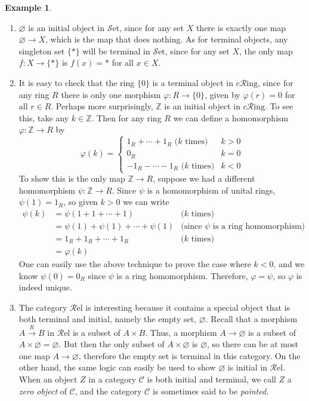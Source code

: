 \documentclass[10pt,oneside]{book}
\def\~#1{\mathscr{#1}}
\def\To#1{\xrightarrow{#1}}
\newcommand{\Z}{\mathbb{Z}}
\newcommand{\Set}{\~S\mathrm{et}}
\newcommand{\Rel}{\~R\mathrm{el}}
\newcommand{\cRing}{\mathrm{c}\~{R}\mathrm{ing}}
\newcommand{\vp}{\varphi}
\theoremstyle{plain}
\theoremstyle{definition}
\newtheorem{ex}[thm]{Example}
\theoremstyle{remark}
\numberwithin{equation}{section}
\numberwithin{figure}{section}
\begin{document}
\begin{ex}
\hfill
\begin{enumerate}[label=(\roman*)]

    \item $\varnothing$ is an initial object in $\Set$, since for any set $X$ there is exactly one map $\varnothing \to X$, which is the map that does nothing. As for terminal objects, any singleton set $\{\ast\}$ will be terminal in $\Set$, since for any set $X$, the only map $f: X \to \{\ast\}$ is $f(x) = \ast$ for all $x \in X$.
    
    \item It is easy to check that the ring $\{0\}$ is a terminal object in $\cRing$, since for any ring $R$ there is only one morphism $\vp: R \to \{0\}$, given by $\vp(r) = 0$ for all $r \in R$. Perhaps more surprisingly, $\Z$ is an initial object in $\cRing$. To see this, take any $k \in \Z$. Then for any ring $R$ we can define a homomorphism $\vp: \Z \to R$ by
        \[ \vp(k) = \begin{cases} 
          1_R + \cdots + 1_R \text{ ($k$ times)} & k > 0 \\
          0_R & k = 0 \\
          -1_R - \cdots - 1_R \text{ ($k$ times)} & k < 0
       \end{cases}\]
   To show this is the only map $\Z \to R$, suppose we had a different homomorphism $\psi: \Z \to R$. Since $\psi$ is a homomorphism of unital rings, $\psi(1)  = 1_R$, so given $k > 0$ we can write 
   \begin{align*}
       \psi(k) &= \psi(1 + 1 + \cdots + 1) & \text{($k$ times)} \\
               &= \psi(1) + \psi(1) + \cdots + \psi(1) & \text{(since $\psi$ is a ring homomorphism)} \\
               &= 1_R + 1_R + \cdots + 1_R & \text{($k$ times)} \\
               &= \vp(k)
   \end{align*}
   One can easily use the above technique to prove the case where $k < 0$, and we know $\psi(0) = 0_R$ since $\psi$ is a ring homomorphism. Therefore, $\vp = \psi$, so $\vp$ is indeed unique.

    \item The category $\Rel$ is interesting because it contains a special object that is both terminal and initial, namely the empty set, $\varnothing$. Recall that a morphism $A \To{R} B$ in $\Rel$ is a subset of $A \times B$. Thus, a morphism $A \to \varnothing$ is a subset of $A \times \varnothing = \varnothing$. But then the only subset of $A \times \varnothing$ is $\varnothing$, so there can be at most one map $A \to \varnothing$, therefore the empty set is terminal in this category. On the other hand, the same logic can easily be used to show $\varnothing$ is initial in $\Rel$. When an object $Z$ in a category $\~C$ is both initial and terminal, we call $Z$ a \emph{zero object} of $\~C$, and the category $\~C$ is sometimes said to be \emph{pointed.}


\end{enumerate}
\end{ex}
\end{document}
